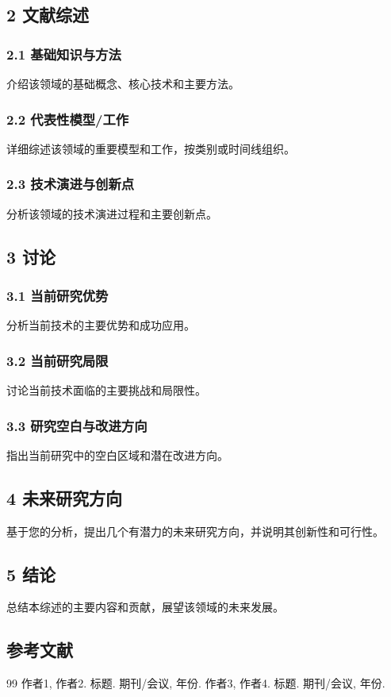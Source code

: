 \documentclass[UTF8]{article}
\begin{document}
\subsection{2 文献综述}

\subsubsection{2.1 基础知识与方法}

介绍该领域的基础概念、核心技术和主要方法。

\subsubsection{2.2 代表性模型/工作}

详细综述该领域的重要模型和工作，按类别或时间线组织。

\subsubsection{2.3 技术演进与创新点}

分析该领域的技术演进过程和主要创新点。

\subsection{3 讨论}

\subsubsection{3.1 当前研究优势}

分析当前技术的主要优势和成功应用。

\subsubsection{3.2 当前研究局限}

讨论当前技术面临的主要挑战和局限性。

\subsubsection{3.3 研究空白与改进方向}

指出当前研究中的空白区域和潜在改进方向。

\subsection{4 未来研究方向}

基于您的分析，提出几个有潜力的未来研究方向，并说明其创新性和可行性。

\subsection{5 结论}

总结本综述的主要内容和贡献，展望该领域的未来发展。

\subsection{参考文献}

\begin{thebibliography}{99}
     作者1, 作者2. 标题. 期刊/会议, 年份.
     作者3, 作者4. 标题. 期刊/会议, 年份.
\end{thebibliography}
\end{document}

